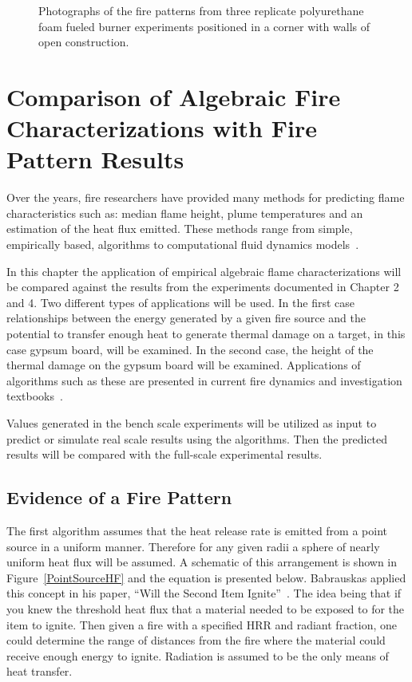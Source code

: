 \documentclass[twoside]{uocthesis}
\begin{document}
\begin{figure}[p]
	\caption[Photographs of the fire patterns from three replicate polyurethane foam burner experiments positioned in a corner]{Photographs of the fire patterns from three replicate polyurethane foam fueled burner experiments positioned in a corner with walls of open construction.}
	\label{PUF_Corner}
\end{figure}


\chapter{Comparison of Algebraic Fire Characterizations with Fire Pattern Results}

Over the years, fire researchers have provided many methods for predicting flame characteristics such as: median flame height, plume temperatures and an estimation of the heat flux emitted. These methods range from simple, empirically based, algorithms to computational fluid dynamics models~\cite{Beyler:1986,Beyler:1999,FDS_Users_Guide,FDS_Tech_Guide}.  

In this chapter the application of empirical algebraic flame characterizations will be compared against the results from the experiments documented in Chapter 2 and 4. Two different types of applications will be used.  In the first case relationships between the energy generated by a given fire source and the potential to transfer enough heat to generate thermal damage on a target, in this case gypsum board, will be examined.  In the second case, the height of the thermal damage on the gypsum board will be examined. Applications of algorithms such as these are presented in current fire dynamics and investigation textbooks~\cite{Icove:2013,Quintiere:1997,Asseal:2010,Beyler:1999}. 

Values generated in the bench scale experiments will be utilized as input to predict or simulate real scale results using the algorithms.  Then the predicted results will be compared with the full-scale experimental results.  

\section{Evidence of a Fire Pattern}

The first algorithm assumes that the heat release rate is emitted from a point source in a uniform manner.  Therefore for any given radii a sphere of nearly uniform heat flux will be assumed. A schematic of this arrangement is shown in Figure~\ref{PointSourceHF} and the equation is presented below. Babrauskas applied this concept in his paper, ``Will the Second Item Ignite''~\cite{Babrauskas:1981}.  The idea being that if you knew the threshold heat flux that a material needed to be exposed to for the item to ignite.  Then given a fire with a specified HRR and radiant fraction, one could determine the range of distances from the fire where the material could receive enough energy to ignite.  Radiation is assumed to be the only means of heat transfer.       
\end{document}
